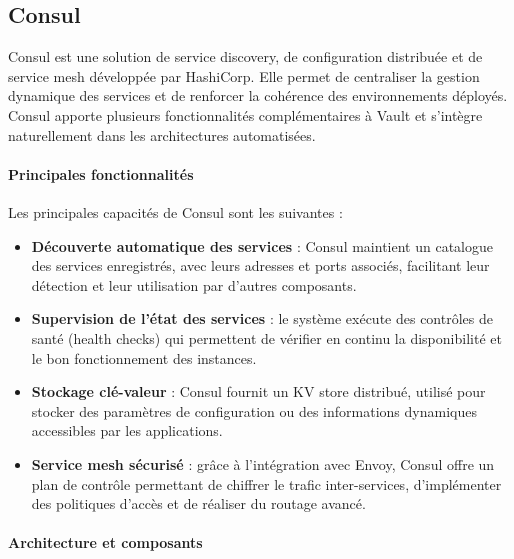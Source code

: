 \subsection{Consul}

Consul est une solution de service discovery, de configuration distribuée et de service mesh développée par HashiCorp. Elle permet de centraliser la gestion dynamique des services et de renforcer la cohérence des environnements déployés. Consul apporte plusieurs fonctionnalités complémentaires à Vault et s’intègre naturellement dans les architectures automatisées.

\paragraph{Principales fonctionnalités}

Les principales capacités de Consul sont les suivantes :
\begin{itemize}
	\item \textbf{Découverte automatique des services} : Consul maintient un catalogue des services enregistrés, avec leurs adresses et ports associés, facilitant leur détection et leur utilisation par d’autres composants.
	\item \textbf{Supervision de l’état des services} : le système exécute des contrôles de santé (health checks) qui permettent de vérifier en continu la disponibilité et le bon fonctionnement des instances.
	\item \textbf{Stockage clé-valeur} : Consul fournit un KV store distribué, utilisé pour stocker des paramètres de configuration ou des informations dynamiques accessibles par les applications.
	\item \textbf{Service mesh sécurisé} : grâce à l’intégration avec Envoy, Consul offre un plan de contrôle permettant de chiffrer le trafic inter-services, d’implémenter des politiques d’accès et de réaliser du routage avancé.
\end{itemize}

\paragraph{Architecture et composants}

